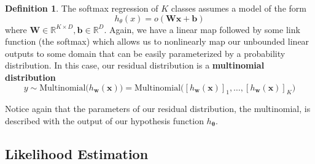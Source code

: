 \documentclass{article}
\theoremstyle{definition}
\theoremstyle{remark}
\theoremstyle{definition}
\newtheorem{definition}{Definition}[section]
\begin{document}
\begin{definition}
The softmax regression of $K$ classes assumes a model of the form 
\[h_\theta (x) = o ( \mathbf{W} \mathbf{x} + \mathbf{b})\]
where $\mathbf{W} \in \mathbb{R}^{K \times D}, \mathbf{b} \in \mathbb{R}^D$. Again, we have a linear map followed by some link function (the softmax) which allows us to nonlinearly map our unbounded linear outputs to some domain that can be easily parameterized by a probability distribution. In this case, our residual distribution is a \textbf{multinomial distribution} 
\[y \sim \mathrm{Multinomial}\big( h_\mathbf{w} (\mathbf{x}) \big) = \mathrm{Multinomial}\big( [h_\mathbf{w} (\mathbf{x})]_1, \ldots, [h_\mathbf{w} (\mathbf{x})]_K \big) \]
\end{definition}

Notice again that the parameters of our residual distribution, the multinomial, is described with the output of our hypothesis function $h_{\boldsymbol{\theta}}$. 

\subsection{Likelihood Estimation}
\end{document}
